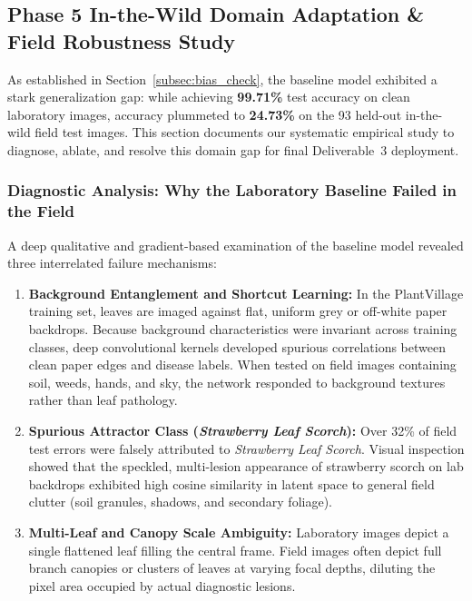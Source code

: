 \subsection{Phase 5 In-the-Wild Domain Adaptation \& Field Robustness Study}
\label{subsec:domain_adaptation}

As established in Section~\ref{subsec:bias_check}, the baseline model exhibited a stark generalization gap: while achieving \textbf{99.71\%} test accuracy on clean laboratory images, accuracy plummeted to \textbf{24.73\%} on the 93 held-out in-the-wild field test images. This section documents our systematic empirical study to diagnose, ablate, and resolve this domain gap for final Deliverable~3 deployment.

\subsubsection{Diagnostic Analysis: Why the Laboratory Baseline Failed in the Field}
A deep qualitative and gradient-based examination of the baseline model revealed three interrelated failure mechanisms:
\begin{enumerate}[leftmargin=*]
    \item \textbf{Background Entanglement and Shortcut Learning:} In the PlantVillage training set, leaves are imaged against flat, uniform grey or off-white paper backdrops. Because background characteristics were invariant across training classes, deep convolutional kernels developed spurious correlations between clean paper edges and disease labels. When tested on field images containing soil, weeds, hands, and sky, the network responded to background textures rather than leaf pathology.
    \item \textbf{Spurious Attractor Class (\textit{Strawberry Leaf Scorch}):} Over 32\% of field test errors were falsely attributed to \textit{Strawberry Leaf Scorch}. Visual inspection showed that the speckled, multi-lesion appearance of strawberry scorch on lab backdrops exhibited high cosine similarity in latent space to general field clutter (soil granules, shadows, and secondary foliage).
    \item \textbf{Multi-Leaf and Canopy Scale Ambiguity:} Laboratory images depict a single flattened leaf filling the central frame. Field images often depict full branch canopies or clusters of leaves at varying focal depths, diluting the pixel area occupied by actual diagnostic lesions.
\end{enumerate}

